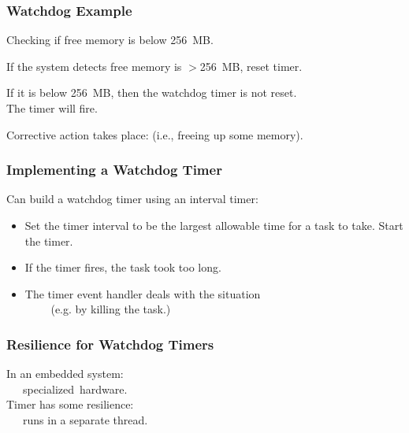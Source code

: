 \begin{frame}
\frametitle{Watchdog Example}
\begin{changemargin}{1cm}

Checking if free memory is below 256~MB. 

If the system detects free memory is $>$256~MB, reset timer.

If it is below 256~MB, then the watchdog timer is not reset. \\
\quad The timer will fire.

Corrective action takes place: (i.e., freeing up some memory).


\end{changemargin}
\end{frame}



\begin{frame}

\frametitle{Implementing a Watchdog Timer}

\begin{changemargin}{1cm}
Can build a watchdog timer using an interval timer:
\begin{itemize}
\item Set the timer interval to be the largest allowable time for a task
to take. Start the timer.
\item If the timer fires, the task took too long.
\item The timer event handler deals with
the situation\\~~~~ (e.g. by killing the task.)
\end{itemize}
\end{changemargin}
\end{frame}


\begin{frame}
\frametitle{Resilience for Watchdog Timers}

\Large
\begin{changemargin}{1cm}
In an embedded system: \\~~~specialized~hardware.\\[1em]

Timer has some resilience: \\~~~runs in a separate thread.
\end{changemargin}

\end{frame}


